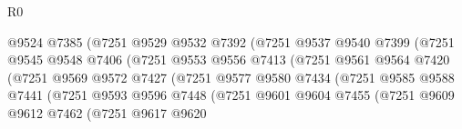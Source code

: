 \begin{lexlean}{R0}
\begin{coremodule}
                                    @9524
                                    @7385
                                    (@7251
                                      @9529
                                      @9532
                                      @7392
                                      (@7251
                                        @9537
                                        @9540
                                        @7399
                                        (@7251
                                          @9545
                                          @9548
                                          @7406
                                          (@7251
                                            @9553
                                            @9556
                                            @7413
                                            (@7251
                                              @9561
                                              @9564
                                              @7420
                                              (@7251
                                                @9569
                                                @9572
                                                @7427
                                                (@7251
                                                  @9577
                                                  @9580
                                                  @7434
                                                  (@7251
                                                    @9585
                                                    @9588
                                                    @7441
                                                    (@7251
                                                      @9593
                                                      @9596
                                                      @7448
                                                      (@7251
                                                        @9601
                                                        @9604
                                                        @7455
                                                        (@7251
                                                          @9609
                                                          @9612
                                                          @7462
                                                          (@7251
                                                            @9617
                                                            @9620

\end{coremodule}
\end{lexlean}
